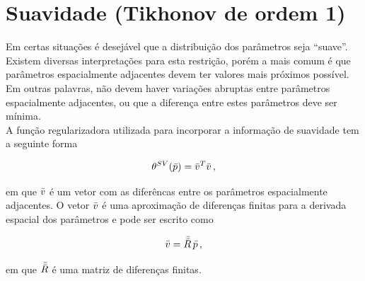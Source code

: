 \section{Suavidade (Tikhonov de ordem 1)}
\label{sec:smoothness}

Em certas situações é desejável que a distribuição dos parâmetros seja ``suave''.
Existem diversas interpretações para esta restrição, porém a mais comum é que
parâmetros espacialmente adjacentes devem ter valores mais próximos possível.
Em outras palavras, não devem haver variações abruptas entre parâmetros
espacialmente adjacentes, ou que a diferença entre estes parâmetros deve ser
mínima.
\\
\indent A função regularizadora utilizada para incorporar a informação de
suavidade tem a seguinte forma

\begin{equation}
\theta^{SV}(\bar{p}) = \bar{v}^T\bar{v} \thinspace ,
\end{equation}

\noindent em que $\bar{v}$ é um vetor com as diferêncas entre os parâmetros
espacialmente adjacentes. O vetor $\bar{v}$ é uma aproximação de diferenças
finitas para a derivada espacial dos parâmetros e pode ser escrito como

\begin{equation}
\bar{v} = \bar{\bar{R}}\thinspace\bar{p} \thinspace ,
\label{eq:vetor_diferencas}
\end{equation}

\noindent em que $\bar{\bar{R}}$ é uma matriz de diferenças finitas.

